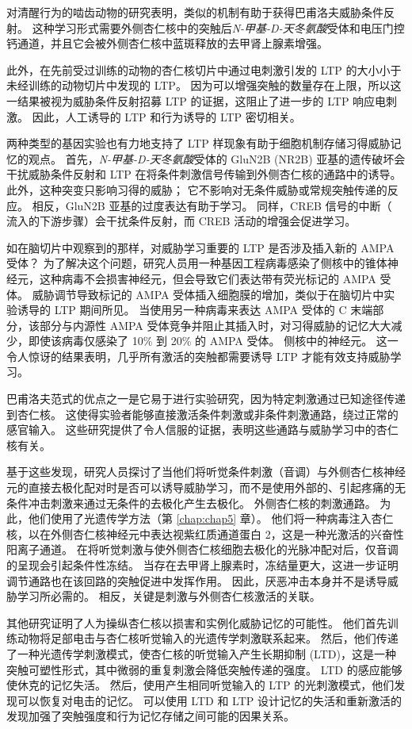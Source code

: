 对清醒行为的啮齿动物的研究表明，类似的机制有助于获得巴甫洛夫威胁条件反射。
这种学习形式需要外侧杏仁核中的突触后\textit{N-甲基-D-天冬氨酸}受体和电压门控钙通道，并且它会被外侧杏仁核中蓝斑释放的去甲肾上腺素增强。


此外，在先前受过训练的动物的杏仁核切片中通过电刺激引发的 LTP 的大小小于未经训练的动物切片中发现的 LTP。
因为可以增强突触的数量存在上限，所以这一结果被视为威胁条件反射招募 LTP 的证据，这阻止了进一步的 LTP 响应电刺激。
因此，人工诱导的 LTP 和行为诱导的 LTP 密切相关。


两种类型的基因实验也有力地支持了 LTP 样现象有助于细胞机制存储习得威胁记忆的观点。
首先，\textit{N-甲基-D-天冬氨酸}受体的 GluN2B (NR2B) 亚基的遗传破坏会干扰威胁条件反射和 LTP 在将条件刺激信号传输到外侧杏仁核的通路中的诱导。
此外，这种突变只影响习得的威胁；
它不影响对无条件威胁或常规突触传递的反应。
相反，GluN2B 亚基的过度表达有助于学习。 同样，CREB 信号的中断（ 流入的下游步骤）会干扰条件反射，而 CREB 活动的增强会促进学习。


如在脑切片中观察到的那样，对威胁学习重要的 LTP 是否涉及插入新的 AMPA 受体？
为了解决这个问题，研究人员用一种基因工程病毒感染了侧核中的锥体神经元，这种病毒不会损害神经元，但会导致它们表达带有荧光标记的 AMPA 受体。
威胁调节导致标记的 AMPA 受体插入细胞膜的增加，类似于在脑切片中实验诱导的 LTP 期间所见。
当使用另一种病毒来表达 AMPA 受体的 C 末端部分，该部分与内源性 AMPA 受体竞争并阻止其插入时，对习得威胁的记忆大大减少，即使该病毒仅感染了 10\% 到 20\% 的 AMPA 受体。
侧核中的神经元。 这一令人惊讶的结果表明，几乎所有激活的突触都需要诱导 LTP 才能有效支持威胁学习。


巴甫洛夫范式的优点之一是它易于进行实验研究，因为特定刺激通过已知途径传递到杏仁核。
这使得实验者能够直接激活条件刺激或非条件刺激通路，绕过正常的感官输入。
这些研究提供了令人信服的证据，表明这些通路与威胁学习中的杏仁核有关。


基于这些发现，研究人员探讨了当他们将听觉条件刺激（音调）与外侧杏仁核神经元的直接去极化配对时是否可以诱导威胁学习，而不是使用外部的、引起疼痛的无条件冲击刺激来通过无条件的去极化产生去极化。
外侧杏仁核的刺激通路。 为此，他们使用了光遗传学方法（第 \ref{chap:chap5} 章）。
他们将一种病毒注入杏仁核，以在外侧杏仁核神经元中表达视紫红质通道蛋白 2，这是一种光激活的兴奋性阳离子通道。
在将听觉刺激与使外侧杏仁核细胞去极化的光脉冲配对后，仅音调的呈现会引起条件性冻结。
当存在去甲肾上腺素时，冻结量更大，这进一步证明调节通路也在该回路的突触促进中发挥作用。
因此，厌恶冲击本身并不是诱导威胁学习所必需的。
相反，关键是刺激与外侧杏仁核激活的关联。


其他研究证明了人为操纵杏仁核以损害和实例化威胁记忆的可能性。
他们首先训练动物将足部电击与杏仁核听觉输入的光遗传学刺激联系起来。
然后，他们传递了一种光遗传学刺激模式，使杏仁核的听觉输入产生长期抑制 (LTD)，这是一种突触可塑性形式，其中微弱的重复刺激会降低突触传递的强度。
LTD 的感应能够使休克的记忆失活。
然后，使用产生相同听觉输入的 LTP 的光刺激模式，他们发现可以恢复对电击的记忆。
可以使用 LTD 和 LTP 设计记忆的失活和重新激活的发现加强了突触强度和行为记忆存储之间可能的因果关系。


